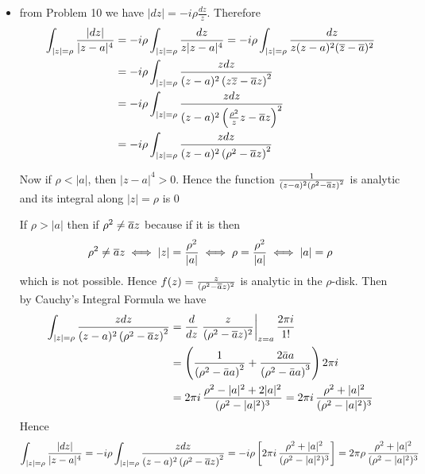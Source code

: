 \documentclass[a4paper, 11pt]{article}
\begin{document}
{\begin{itemize}
        \item from Problem 10 we have $|dz|=-i\rho \frac{dz}{z}$. Therefore \begin{align*}
                  \int_{|z|=\rho}\frac{|dz|}{|z-a|^4} & = -i\rho \int_{|z|=\rho}\frac{dz}{z|z-a|^4}= -i\rho \int_{|z|=\rho}\frac{dz}{z(z-a)^2(\overline{z}-\overline{a})^2} \\
                                                      & = -i\rho \int_{|z|=\rho}\frac{zdz}{(z-a)^2\left(z\overline{z}-\overline{a} z  \right)^2}                                 \\
                                                      & = -i\rho \int_{|z|=\rho}\frac{zdz}{(z-a)^2\left(\frac{\rho^2}{z}z-\overline{a} z\right)^2}                       \\
                                                      & = -i\rho \int_{|z|=\rho}\frac{zdz}{(z-a)^2\left(\rho^2-\overline{a} z\right)^2}
              \end{align*}\parinn

              Now if $\rho < |a|$, then $|z-a|^4>0$. Hence the function $\frac1{(z-a)^2\left(\rho^2-\overline{a} z\right)^2}$ is analytic and its integral  along $|z|=\rho$ is 0\parinn

              If $\rho > |a|$ then if $\rho^2\neq \overline{a} z$ because if it is then \begin{align*}
                  \rho^2\neq \overline{a} z \iff |z| =\frac{\rho^2}{|a|} \iff \rho = \frac{\rho^2}{|a|} \iff |a|=\rho
              \end{align*} which is not possible. Hence $f(z)=\frac{z}{(\rho^2-\overline{a} z)^2}$ is analytic in the $\rho$-disk. Then by Cauchy's Integral Formula we have\begin{align*}
                  \int_{|z|=\rho}\frac{zdz}{(z-a)^2\left(\rho^2-\overline{a} z\right)^2} & =\frac{d}{dz}\left. \frac{z}{(\rho^2-\overline{a} z)^2}\right|_{z=a} \frac{2\pi i}{1!}                                             \\
                                                                            & = \left(\frac{1}{\left(\rho^2-\bar{a} a\right)^2}+\frac{2 \bar{a} a}{\left(\rho^2-\bar{a} a\right)^3}\right)  2 \pi i \\
                                                                            & = 2\pi i \, \frac{\rho^2-|a|^2+2|a|^2}{(\rho^2-|a|^2)^3}=2\pi i \, \frac{\rho^2+|a|^2}{(\rho^2-|a|^2)^3}
              \end{align*}Hence $$	\int_{|z|=\rho}\frac{|dz|}{|z-a|^4}=-i\rho \int_{|z|=\rho}\frac{zdz}{(z-a)^2\left(\rho^2-\overline{a} z\right)^2}=-i\rho \left[ 2\pi i \, \frac{\rho^2+|a|^2}{(\rho^2-|a|^2)^3} \right]=2\pi\rho\, \frac{\rho^2+|a|^2}{(\rho^2-|a|^2)^3}$$
    \end{itemize}
}
\end{document}
